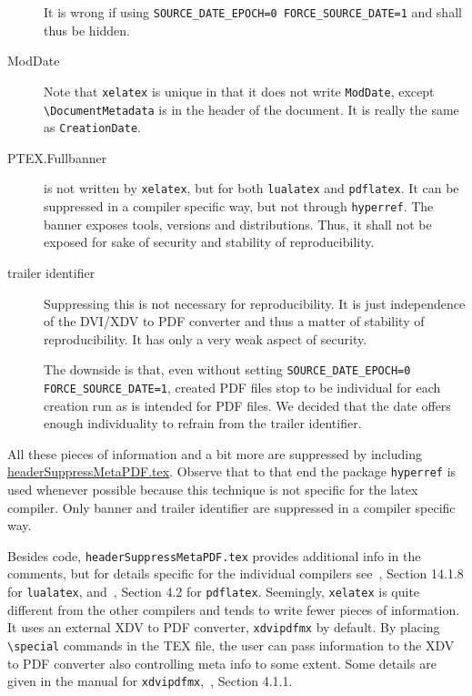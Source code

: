 \documentclass[a4paper, english]{article}%
\newcommand{\pdflatex}{\texttt{pdflatex}}
\newcommand{\lualatex}{\texttt{lualatex}}
\newcommand{\xelatex}{\texttt{xelatex}}
\newcommand{\cmd}[1]{\texttt{\textbackslash#1}}
\begin{document}
\begin{description}
  It is wrong if using \texttt{SOURCE\_DATE\_EPOCH=0 FORCE\_SOURCE\_DATE=1} 
  and shall thus be hidden. 
  \item[ModDate] 
  Note that \xelatex{} is unique in that it does not write \texttt{ModDate}, 
  except \cmd{DocumentMetadata} is in the header of the document. 
  It is really the same as \texttt{CreationDate}. 
  \item[PTEX.Fullbanner] is not written by \xelatex, 
  but for both \lualatex{} and \pdflatex. 
  It can be suppressed in a compiler specific way, 
  but not through \texttt{hyperref}. 
  The banner exposes tools, versions and distributions. 
  Thus, it shall not be exposed for sake of security and stability of reproducibility. 
  \item[trailer identifier]
  Suppressing this is not necessary for reproducibility. 
  It is just independence of the DVI/XDV to PDF converter 
  and thus a matter of stability of reproducibility. 
  It has only a very weak aspect of security. 
  
  The downside is that, 
  even without setting \texttt{SOURCE\_DATE\_EPOCH=0 FORCE\_SOURCE\_DATE=1}, 
  created PDF files stop to be individual for each creation run 
  as is intended for PDF files. 
  We decided that the date offers enough individuality 
  to refrain from the trailer identifier. 
\end{description}

All these pieces of information 
and a bit more are suppressed 
by including \href{\urlSite fromTex/headerSuppressMetaPDF.tex}{headerSuppressMetaPDF.tex}. 
Observe that to that end the package \texttt{hyperref} is used 
whenever possible because this technique is not specific for the latex compiler. 
Only banner and trailer identifier are suppressed in a compiler specific way. 

Besides code, \texttt{headerSuppressMetaPDF.tex} provides 
additional info in the comments, 
but for details specific for the individual compilers 
see~\cite{LuaTexRef24}, Section 14.1.8 for \lualatex, 
and~\cite{PdfTexUsr24}, Section 4.2 for \pdflatex. 
Seemingly, \xelatex{} is quite different from the other compilers 
and tends to write fewer pieces of information. 
It uses an external XDV to PDF converter, \texttt{xdvipdfmx} by default. 
By placing \cmd{special} commands in the TEX file, 
the user can pass information to the XDV to PDF converter 
also controlling meta info to some extent. 
Some details are given in the 
manual for \texttt{xdvipdfmx},~\cite{DviPdfMx}, Section 4.1.1. 
\end{document}
